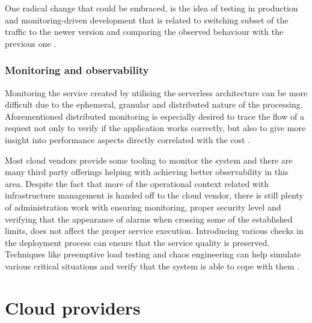 One radical change that could be embraced, is the idea of testing in production and monitoring-driven development that is related to switching subset of the traffic to the newer version and comparing the observed behaviour with the previous one \cite{MartinFowlerServerless}.

\subsubsection*{Monitoring and observability}

Monitoring the service created by utilising the serverless architecture can be more difficult due to the ephemeral, granular and distributed nature of the processing. Aforementioned distributed monitoring is especially desired to trace the flow of a request not only to verify if the application works correctly, but also to give more insight into performance aspects directly correlated with the cost \cite{LeveragingServerlessCloudComputingArchitectures}.

Most cloud vendors provide some tooling to monitor the system and there are many third party offerings helping with achieving better observability in this area. Despite the fact that more of the operational context related with infrastructure management is handed off to the cloud vendor, there is still plenty of administration work with ensuring monitoring, proper security level and verifying that the appearance of alarms when crossing some of the established limits, does not affect the proper service execution. Introducing various checks in the deployment process can ensure that the service quality is preserved. Techniques like preemptive load testing and chaos engineering can help simulate various critical situations and verify that the system is able to cope with them \cite{MartinFowlerServerless}.

\section{Cloud providers} \label{chapter:serverless-service-providers}

